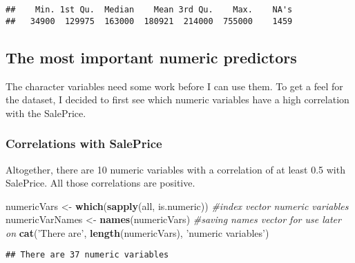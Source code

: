 \documentclass[]{article}
\newenvironment{Shaded}{\begin{snugshade}}{\end{snugshade}}
\newcommand{\KeywordTok}[1]{\textcolor[rgb]{0.13,0.29,0.53}{\textbf{#1}}}
\newcommand{\StringTok}[1]{\textcolor[rgb]{0.31,0.60,0.02}{#1}}
\newcommand{\CommentTok}[1]{\textcolor[rgb]{0.56,0.35,0.01}{\textit{#1}}}
\newcommand{\OperatorTok}[1]{\textcolor[rgb]{0.81,0.36,0.00}{\textbf{#1}}}
\newcommand{\NormalTok}[1]{#1}
\begin{document}
\begin{Shaded}
\end{Shaded}

\begin{verbatim}
##    Min. 1st Qu.  Median    Mean 3rd Qu.    Max.    NA's 
##   34900  129975  163000  180921  214000  755000    1459
\end{verbatim}

\subsection{The most important numeric
predictors}\label{the-most-important-numeric-predictors}

The character variables need some work before I can use them. To get a
feel for the dataset, I decided to first see which numeric variables
have a high correlation with the SalePrice.

\subsubsection{Correlations with
SalePrice}\label{correlations-with-saleprice}

Altogether, there are 10 numeric variables with a correlation of at
least 0.5 with SalePrice. All those correlations are positive.

\begin{Shaded}
\begin{Highlighting}[]
\NormalTok{numericVars <-}\StringTok{ }\KeywordTok{which}\NormalTok{(}\KeywordTok{sapply}\NormalTok{(all, is.numeric)) }\CommentTok{#index vector numeric variables}
\NormalTok{numericVarNames <-}\StringTok{ }\KeywordTok{names}\NormalTok{(numericVars) }\CommentTok{#saving names vector for use later on}
\KeywordTok{cat}\NormalTok{(}\StringTok{'There are'}\NormalTok{, }\KeywordTok{length}\NormalTok{(numericVars), }\StringTok{'numeric variables'}\NormalTok{)}
\end{Highlighting}
\end{Shaded}

\begin{verbatim}
## There are 37 numeric variables
\end{verbatim}
\end{document}
